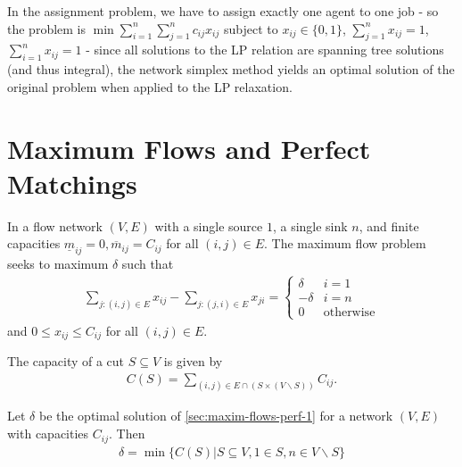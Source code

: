 \begin{thm}
  \label{sec:transp-assignm-probl-3}
  In the assignment problem, we have to assign exactly one agent to
  one job - so the problem is $\min \sum_{i=1}^{n} \sum_{j=1}^{n}
  c_{ij} x_{ij}$ subject to $x_{ij} \in \{ 0, 1 \}$, $\sum_{j=1}^{n}
  x_{ij} = 1$, $\sum_{i=1}^{n} x_{ij} = 1$ - since all solutions to
  the LP relation are spanning tree solutions (and thus integral), the
  network simplex method yields an optimal solution of the original
  problem when applied to the LP relaxation.
\end{thm}

\section{Maximum Flows and Perfect Matchings}
\label{sec:maxim-flows-perf}

\begin{defn}
  \label{sec:maxim-flows-perf-1}
  In a flow network $(V, E)$ with a single source $1$, a single sink
  $n$, and finite capacities $\underline m_{ij} = 0, \overline m_{ij} = C_{ij}$ for all $(i,
  j) \in E$.    The maximum flow problem seeks to maximum $\delta$
  such that
  \begin{align}
    \label{eq:8}
    \sum_{j: (i, j) \in E}^{} x_{ij} - \sum_{j: (j, i) \in E}^{}
    x_{ji} =
    \begin{cases}
      \delta & i = 1 \\
      -\delta & i = n \\
      0 & \text{otherwise}
    \end{cases}
  \end{align} and $0 \leq x_{ij} \leq C_{ij}$ for all $(i, j) \in E$.
\end{defn}

\begin{defn}
  The capacity of a cut $S \subseteq V$ is given by
  \begin{align}
    \label{eq:10}
    C(S) = \sum_{(i, j) \in E \cap (S \times (V \backslash S))}^{} C_{ij}.
  \end{align}
\end{defn}

\begin{thm}
  \label{sec:maxim-flows-perf-2}
  Let $\delta$ be the optimal solution of
  \ref{sec:maxim-flows-perf-1} for a network $(V, E)$ with capacities
  $C_{ij}$.  Then
  \begin{align}
    \label{eq:9}
    \delta = \min \{ C(S) | S \subseteq V, 1 \in S, n \in V \backslash
    S \}
  \end{align}
\end{thm}

